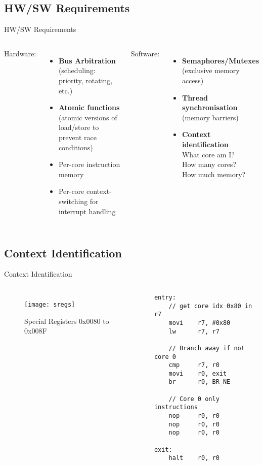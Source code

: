 \documentclass[aspectratio=169]{beamer}
\begin{document}
\subsection{HW/SW Requirements}
\begin{frame}{HW/SW Requirements}
\begin{columns}[t]
Hardware:
\begin{itemize}[<+->]
    \item \textbf{Bus Arbitration}\\ (scheduling: priority, rotating, etc.)
    \item \textbf{Atomic functions}\\ (atomic versions of load/store to prevent race conditions)
    \item Per-core instruction memory
    \item Per-core context-switching for interrupt handling
\end{itemize}
Software:
\begin{itemize}[<+->]
    \item \textbf{Semaphores/Mutexes}\\ (exclusive memory access)
    \item \textbf{Thread synchronisation}\\ (memory barriers)
    \item \textbf{Context identification}\\ What core am I?\\ How many cores?\\ How much memory?
\end{itemize}
\end{columns}
\end{frame}

\subsection{Context Identification}
\begin{frame}[fragile]{Context Identification}
\begin{columns}
\begin{figure}
\texttt{[image: sregs]}
\caption{Special Registers 0x0080 to 0x008F}
\end{figure}
\begin{lstlisting}[basicstyle=\scriptsize]
entry:
    // get core idx 0x80 in r7
    movi    r7, #0x80
    lw      r7, r7

    // Branch away if not core 0
    cmp     r7, r0
    movi    r0, exit
    br      r0, BR_NE 
    
    // Core 0 only instructions
    nop     r0, r0
    nop     r0, r0
    nop     r0, r0
    
exit:
    halt    r0, r0    
\end{lstlisting}
\end{columns}
\end{frame}
\end{document}
